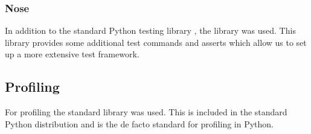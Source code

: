 \documentclass[a4paper, openany, oneside]{memoir}
\begin{document}
\subsubsection{Nose}
\label{ssub:Nose}
In addition to the standard Python testing library , the library  was used. This library provides some additional test commands and asserts which allow us to set up a more extensive test framework.


\subsection{Profiling}
\label{sec:profiling}
For profiling the standard  library was used. This is included in the standard Python distribution and is the de facto standard for profiling in Python.
\end{document}
